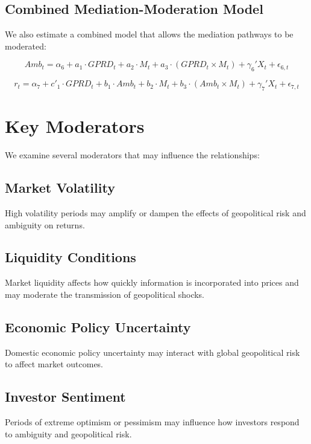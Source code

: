 \documentclass{article}
\begin{document}
\subsection{Combined Mediation-Moderation Model}

We also estimate a combined model that allows the mediation pathways to be moderated:

\begin{equation}
Amb_t = \alpha_6 + a_1 \cdot GPRD_t + a_2 \cdot M_t + a_3 \cdot (GPRD_t \times M_t) + \gamma_6' X_t + \epsilon_{6,t}
\end{equation}

\begin{equation}
r_t = \alpha_7 + c'_1 \cdot GPRD_t + b_1 \cdot Amb_t + b_2 \cdot M_t + b_3 \cdot (Amb_t \times M_t) + \gamma_7' X_t + \epsilon_{7,t}
\end{equation}

\section{Key Moderators}

We examine several moderators that may influence the relationships:

\subsection{Market Volatility}
High volatility periods may amplify or dampen the effects of geopolitical risk and ambiguity on returns.

\subsection{Liquidity Conditions}
Market liquidity affects how quickly information is incorporated into prices and may moderate the transmission of geopolitical shocks.

\subsection{Economic Policy Uncertainty}
Domestic economic policy uncertainty may interact with global geopolitical risk to affect market outcomes.

\subsection{Investor Sentiment}
Periods of extreme optimism or pessimism may influence how investors respond to ambiguity and geopolitical risk.
\end{document}
